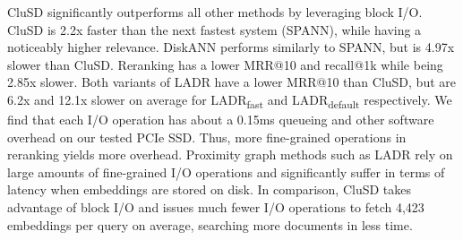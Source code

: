 CluSD significantly outperforms all other methods by leveraging block I/O.
CluSD is 2.2x faster than the next fastest system (SPANN), while having a noticeably higher relevance.
DiskANN performs similarly to SPANN, but is 4.97x slower than CluSD.
Reranking has a lower MRR@10 and recall@1k while being 2.85x slower.
Both variants of LADR have a lower MRR@10 than CluSD, but are 6.2x and 12.1x slower on average for LADR\textsubscript{fast} and LADR\textsubscript{default} respectively.
We find that  each  I/O operation has about a 0.15ms queueing and other software overhead on our tested PCIe SSD.
Thus, more fine-grained operations in reranking yields more overhead.
Proximity graph methods such as LADR rely on large amounts of fine-grained I/O operations and significantly suffer in terms of latency when embeddings are stored on disk.
In comparison, CluSD takes advantage of block I/O and issues much fewer I/O operations to fetch 4,423 embeddings per query on average,
searching more documents in less time.





                                     


